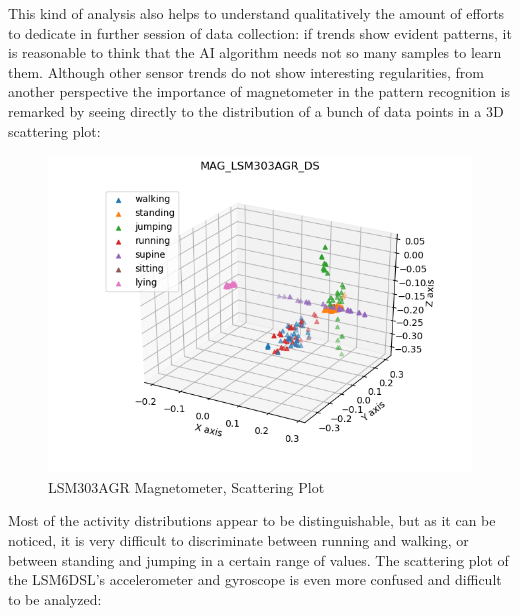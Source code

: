 This kind of analysis also helps to understand qualitatively the amount of efforts to dedicate in further session of data collection: if trends show evident patterns, it is reasonable to think that the AI algorithm needs not so many samples to learn them. Although other sensor trends do not show interesting regularities, from another perspective the importance of magnetometer in the pattern recognition is remarked by seeing directly to the distribution of a bunch of data points in a 3D scattering plot:
\begin{figure}[H]
	\hfill\includegraphics[scale=0.8]{figures/scatter3d_MAG_LSM303AGR_DS.png}\hspace*{\fill}
	\caption{LSM303AGR Magnetometer, Scattering Plot }\label{fig:8}
	\centering
\end{figure}
Most of the activity distributions appear to be distinguishable, but as it can be noticed, it is very difficult to discriminate between running and walking, or between standing and jumping in a certain range of values. The scattering plot of the LSM6DSL's accelerometer and gyroscope is even more confused and difficult to be analyzed:
